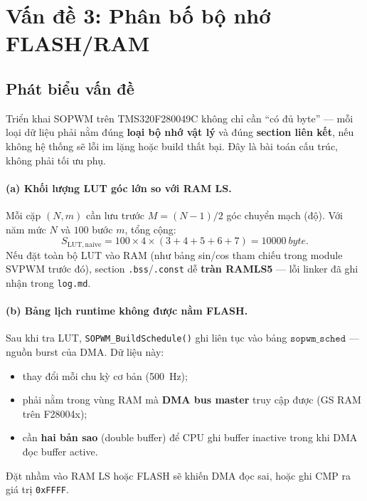 
\section{Vấn đề 3: Phân bố bộ nhớ FLASH/RAM}
\label{sec:van_de_3_mem}

\subsection{Phát biểu vấn đề}

Triển khai SOPWM trên TMS320F280049C không chỉ cần ``có đủ byte'' --- mỗi loại dữ liệu phải nằm đúng \textbf{loại bộ nhớ vật lý} và đúng \textbf{section liên kết}, nếu không hệ thống sẽ lỗi im lặng hoặc build thất bại. Đây là bài toán cấu trúc, không phải tối ưu phụ.

\paragraph{(a) Khối lượng LUT góc lớn so với RAM LS.}
Mỗi cặp $(N, m)$ cần lưu trước $M=(N-1)/2$ góc chuyển mạch (độ). Với năm mức $N$ và $100$ bước $m$, tổng cộng:
\begin{equation}
  S_{\mathrm{LUT,naive}} = 100 \times 4 \times (3+4+5+6+7) = \SI{10000}{byte}.
  \label{eq:lut_total}
\end{equation}
Nếu đặt toàn bộ LUT vào RAM (như bảng sin/cos tham chiếu trong module SVPWM trước đó), section \texttt{.bss}/\texttt{.const} dễ \textbf{tràn RAMLS5} --- lỗi linker đã ghi nhận trong \texttt{log.md}.

\paragraph{(b) Bảng lịch runtime không được nằm FLASH.}
Sau khi tra LUT, \texttt{SOPWM\_BuildSchedule()} ghi liên tục vào bảng $\texttt{sopwm\_sched}$ --- nguồn burst của DMA. Dữ liệu này:
\begin{itemize}[noitemsep]
  \item thay đổi mỗi chu kỳ cơ bản (\SI{500}{\hertz});
  \item phải nằm trong vùng RAM mà \textbf{DMA bus master} truy cập được (GS RAM trên F28004x);
  \item cần \textbf{hai bản sao} (double buffer) để CPU ghi buffer inactive trong khi DMA đọc buffer active.
\end{itemize}
Đặt nhầm vào RAM LS hoặc FLASH sẽ khiến DMA đọc sai, hoặc ghi CMP ra giá trị \texttt{0xFFFF}.

